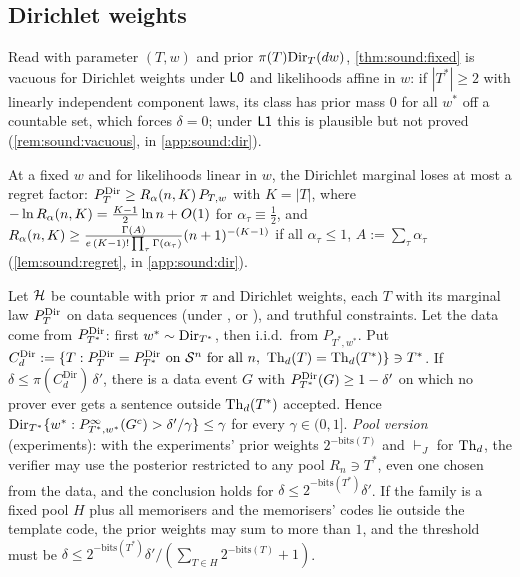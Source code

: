 \subsection{Dirichlet weights}\label{sec:sound:dir}

Read with parameter $(T,w)$ and prior $\pi(T)\mathrm{Dir}_T(dw)$, \cref{thm:sound:fixed} is vacuous for Dirichlet weights under $\mathord{\mathsf{L0}}$ and likelihoods affine in $w$: if $|T^*|\ge2$ with linearly independent component laws, its class has prior mass $0$ for all $w^*$ off a countable set, which forces $\delta=0$; under $\mathord{\mathsf{L1}}$ this is plausible but not proved (\cref{rem:sound:vacuous}, in \cref{app:sound:dir}).

At a fixed $w$ and for likelihoods linear in $w$, the Dirichlet marginal loses at most a regret factor: $P^{\mathrm{Dir}}_{T}\ge R_{\alpha}(n,K)\,P_{T,w}$ with $K=|T|$, where $-\ln R_{\alpha}(n,K)=\frac{K-1}2\ln n+O(1)$ for $\alpha_\tau\equiv\frac12$, and $R_{\alpha}(n,K)\ge\frac{\Gamma(A)}{e\,(K-1)!\prod_\tau\Gamma(\alpha_\tau)}(n+1)^{-(K-1)}$ if all $\alpha_\tau\le1$, $A:=\sum_\tau\alpha_\tau$ (\cref{lem:sound:regret}, in \cref{app:sound:dir}).

\begin{theorem}\label{thm:sound:avg}
Let $\mathcal{H}$ be countable with prior $\pi$ and Dirichlet weights, each $T$ with its marginal law $P^{\mathrm{Dir}}_{T}$ on data sequences (under \Lzero, \Lone{} or \Ltwo), and truthful constraints. Let the data come from $P^{\mathrm{Dir}}_{T^*}$: first $w^*\sim\mathrm{Dir}_{T^*}$, then i.i.d.\ from $P_{T^*,w^*}$. Put $C^{\mathrm{Dir}}_d:=\{T:P^{\mathrm{Dir}}_{T}=P^{\mathrm{Dir}}_{T^*}\text{ on }\mathcal S^n\text{ for all }n,\ \mathrm{Th}_d(T)=\mathrm{Th}_d(T^*)\}\ni T^*$. If $\delta\le\pi(C^{\mathrm{Dir}}_d)\,\delta'$, there is a data event $G$ with $P^{\mathrm{Dir}}_{T^*}(G)\ge1-\delta'$ on which no prover ever gets a sentence outside $\mathrm{Th}_d(T^*)$ accepted. Hence $\mathrm{Dir}_{T^*}\{w^*:P^\infty_{T^*,w^*}(G^c)>\delta'/\gamma\}\le\gamma$ for every $\gamma\in(0,1]$.
\emph{Pool version} (experiments): with the experiments' prior weights $2^{-\mathrm{bits}(T)}$ and $\vdash_J$ for $\mathrm{Th}_d$, the verifier may use the posterior restricted to any pool $R_n\ni T^*$, even one chosen from the data, and the conclusion holds for $\delta\le2^{-\mathrm{bits}(T^*)}\delta'$. If the family is a fixed pool $H$ plus all memorisers and the memorisers' codes lie outside the template code, the prior weights may sum to more than $1$, and the threshold must be $\delta\le2^{-\mathrm{bits}(T^*)}\delta'/(\sum_{T\in H}2^{-\mathrm{bits}(T)}+1)$.
\end{theorem}

